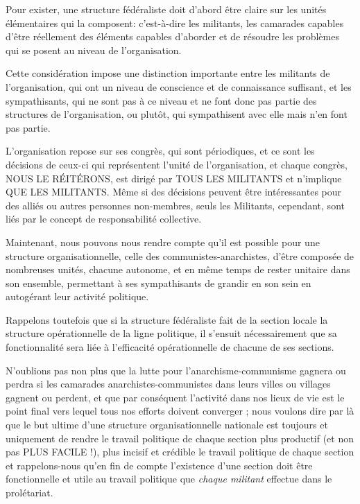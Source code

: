 Pour exister, une structure fédéraliste doit d'abord être claire sur les unités élémentaires qui la composent: c'est-à-dire les militants, les camarades capables d'être réellement des éléments capables d'aborder et de résoudre les problèmes qui se posent au niveau de l'organisation.

Cette considération impose une distinction importante entre les militants de l'organisation, qui ont un niveau de conscience et de connaissance suffisant, et les sympathisants, qui ne sont pas à ce niveau et ne font donc pas partie des structures de l'organisation, ou plutôt, qui sympathisent avec elle mais n'en font pas partie.

L'organisation repose sur ses congrès, qui sont périodiques, et ce sont les décisions de ceux-ci qui représentent l'unité de l'organisation, et chaque congrès, NOUS LE RÉITÉRONS, est dirigé par TOUS LES MILITANTS et n'implique QUE LES MILITANTS. Même si des décisions peuvent être intéressantes pour des alliés ou autres personnes non-membres, seuls les Militants, cependant, sont liés par le concept de responsabilité collective.

Maintenant, nous pouvons nous rendre compte qu'il est possible pour une structure organisationnelle, celle des communistes-anarchistes, d'être composée de nombreuses unités, chacune autonome, et en même temps de rester unitaire dans son ensemble, permettant à ses sympathisants de grandir en son sein en autogérant leur activité politique.

Rappelons toutefois que si la structure fédéraliste fait de la section locale la structure opérationnelle de la ligne politique, il s'ensuit nécessairement que sa fonctionnalité sera liée à l'efficacité opérationnelle de chacune de ses sections.

N'oublions pas non plus que la lutte pour l'anarchisme-communisme gagnera ou perdra si les camarades anarchistes-communistes dans leurs villes ou villages gagnent ou perdent, et que par conséquent l'activité dans nos lieux de vie est le point final vers lequel tous nos efforts doivent converger ; nous voulons dire par là que le but ultime d'une structure organisationnelle nationale est toujours et uniquement de rendre le travail politique de chaque section plus productif (et non pas PLUS FACILE !), plus incisif et crédible le travail politique de chaque section et rappelons-nous qu'en fin de compte l'existence d'une section doit être fonctionnelle et utile au travail politique que \emph{chaque militant} effectue dans le prolétariat.

